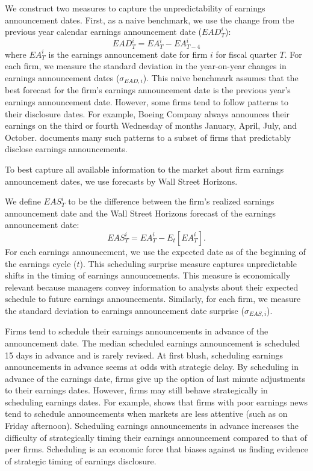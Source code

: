 \documentclass[authoryear,letterpaper,english,12pt]{elsarticle}
\begin{document}
We construct two measures to capture the unpredictability of earnings announcement dates. First, as a naive benchmark, we use the change from the previous year calendar earnings announcement date ($EAD^{i}_{T}$): 
\begin{equation}
    EAD^{i}_{T} =EA^{i}_{T} - EA^{i}_{T-4}
\end{equation}
where $EA^{i}_{T}$ is the earnings announcement date for firm $i$ for fiscal quarter $T$. For each firm, we measure the standard deviation in the year-on-year changes in earnings announcement dates ($\sigma_{EAD,i}$). This naive benchmark assumes that the best forecast for the firm's earnings announcement date is the previous year's earnings announcement date. However, some firms tend to follow patterns to their disclosure dates. For example, Boeing Company always announces their earnings on the third or fourth Wednesday of months January, April, July, and October. \cite{noh2021calendar} documents many such patterns to a subset of firms that predictably disclose earnings announcements. 

To best capture all available information to the market about firm earnings announcement dates, we use forecasts by Wall Street Horizons. %

We define $EAS^{i}_{T}$ to be the difference between the firm's realized earnings announcement date and the Wall Street Horizons forecast of the earnings announcement date: 
\begin{equation}
    EAS^{i}_{T} =EA^{i}_{T} - E_{t}[EA^{i}_{T}].
\end{equation}
For each earnings announcement, we use the expected date as of the beginning of the earnings cycle ($t$). This scheduling surprise measure captures unpredictable shifts in the timing of earnings announcements. This measure is economically relevant because managers convey information to analysts about their expected schedule to future earnings announcements. Similarly, for each firm, we measure the standard deviation to earnings announcement date surprise ($\sigma_{EAS,i}$).

Firms tend to schedule their earnings announcements in advance of the announcement date. The median scheduled earnings announcement is scheduled 15 days in advance and is rarely revised. At first blush, scheduling earnings announcements in advance seems at odds with strategic delay. By scheduling in advance of the earnings date, firms give up the option of last minute adjustments to their earnings dates. However, firms may still behave strategically in scheduling earnings dates. For example, \cite{dehaan2015market} shows that firms with poor earnings news tend to schedule announcements when markets are less attentive (such as on Friday afternoon). Scheduling earnings announcements in advance increases the difficulty of strategically timing their earnings announcement compared to that of peer firms. Scheduling is an economic force that biases against us finding evidence of strategic timing of earnings disclosure. 
\end{document}
